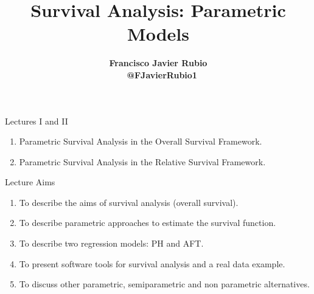 \documentclass[10pt,handout,compress]{beamer}
\title[]{Survival Analysis:  Parametric Models}
\author[]{ \textbf{Francisco Javier Rubio \\
\faTwitter \,\,\, @FJavierRubio1}}
\date{}
\begin{document}
\begin{frame}
  \titlepage
\end{frame}
%

\begin{frame}{Lectures I and II}
\begin{enumerate}
\item Parametric Survival Analysis in the Overall Survival Framework.
\item Parametric Survival Analysis in the Relative Survival Framework.
\end{enumerate}
\end{frame}

\begin{frame}{Lecture Aims}
\begin{enumerate}
\item To describe the aims of survival analysis (overall survival).
\item To describe parametric approaches to estimate the survival function.
\item To describe two regression models: PH and AFT.
\item To present software tools for survival analysis and a real data example.
\item To discuss other parametric, semiparametric and non parametric alternatives.
\end{enumerate}
\end{frame}
\end{document}
